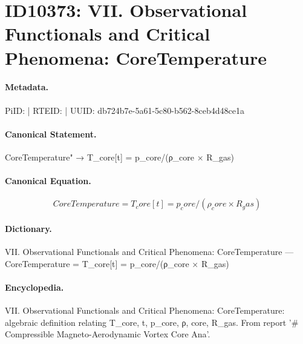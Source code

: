 \section*{ID10373: VII. Observational Functionals and Critical Phenomena: CoreTemperature}
\paragraph{Metadata.}
PiID:  | RTEID:  | UUID: db724b7e-5a61-5c80-b562-8ceb4d48ce1a

\paragraph{Canonical Statement.}
CoreTemperature" → T\_core[t] = p\_core/(ρ\_core × R\_gas)

\paragraph{Canonical Equation.}
\[
CoreTemperature = T_core[t] = p_core/(ρ_core × R_gas)
\]

\paragraph{Dictionary.}
VII. Observational Functionals and Critical Phenomena: CoreTemperature — CoreTemperature = T\_core[t] = p\_core/(ρ\_core × R\_gas)

\paragraph{Encyclopedia.}
VII. Observational Functionals and Critical Phenomena: CoreTemperature: algebraic definition relating T\_core, t, p\_core, ρ, core, R\_gas. From report '\# Compressible Magneto-Aerodynamic Vortex Core Ana'.
